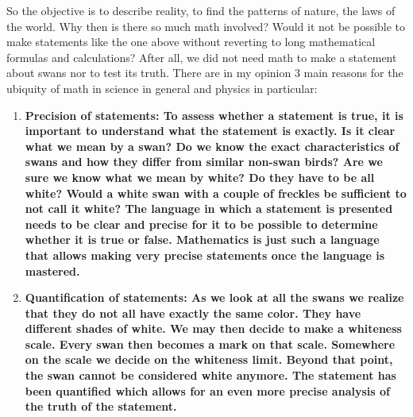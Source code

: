 \noindent So the objective is to describe reality, to find the patterns of nature, the laws of the world. Why then is there so much math involved? Would it not be possible to make statements like the one above without reverting to long mathematical formulas and calculations? After all, we did not need math to make a statement about swans nor to test its truth. There are in my opinion 3 main reasons for the ubiquity of math in science in general and physics in particular:
\begin{enumerate}
	
	\item \bfseries Precision of statements: \normalfont To assess whether a statement is true, it is important to understand what the statement is exactly. Is it clear what we mean by a swan? Do we know the exact characteristics of swans and how they differ from similar non-swan birds? Are we sure we know what we mean by white? Do they have to be all white? Would a white swan with a couple of freckles be sufficient to not call it white? The language in which a statement is presented needs to be clear and precise for it to be possible to determine whether it is true or false. Mathematics is just such a language that allows making very precise statements once the language is mastered.
	
	\item	\bfseries Quantification of statements: \normalfont As we look at all the swans we realize that they do not all have exactly the same color. They have different shades of white. We may then decide to make a whiteness scale. Every swan then becomes a mark on that scale. Somewhere on the scale we decide on the whiteness limit. Beyond that point, the swan cannot be considered white anymore. The statement has been quantified which allows for an even more precise analysis of the truth of the statement. 
	

\end{enumerate}
